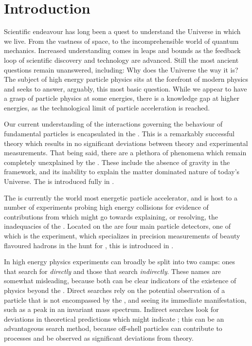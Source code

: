 \chapter{Introduction}
\label{ch:intro}


Scientific endeavour has long been a quest to understand the Universe in which we live.
From the vastness of space, to the incomprehensible world of quantum mechanics.
Increased understanding comes in leaps and bounds as the feedback loop of scientific discovery and
technology are advanced.
Still the most ancient questions remain unanswered, including: Why does the Universe the way it is?
The subject of high energy particle physics sits at the forefront of modern physics and seeks to
answer, arguably, this most basic question.
While we appear to have a grasp of particle physics at some energies, there is a knowledge gap at
higher energies, as the technological limit of particle acceleration is reached.

Our current understanding of the interactions governing the behaviour of fundamental particles is
encapsulated in the \sm.
This is a remarkably successful theory which results in no significant deviations between theory
and experimental measurements.
That being said, there are a plethora of phenomena which remain completely unexplained by the \sm.
These include the absence of gravity in the \sm framework, and its inability to explain the matter
dominated nature of today's Universe.
The \sm is introduced fully in .

The \lhc is currently the world most energetic particle accelerator, and is host to a number of
experiments probing high energy collisions for evidence of contributions from \np which might go
towards explaining, or resolving, the inadequacies of the \sm.
Located on the \lhc are four main particle detectors, one of which is the \lhcb experiment, which
specializes in precision measurements of beauty
flavoured hadrons in the hunt for \np, this is introduced in .

In high energy physics experiments can broadly be split into two camps: ones that search for \np
\emph{directly} and those that search \emph{indirectly}.
These names are somewhat misleading, because both can be clear indicators of the existence of
physics beyond the \sm.
Direct searches rely on the potential observation of a particle that is not encompassed by the \sm,
and seeing its immediate manifestation, such as a peak in an invariant mass spectrum.
Indirect searches look for deviations in theoretical predictions which might indicate \np; this can
be an advantageous search method, because off-shell particles can contribute to processes and be
observed as significant deviations from theory.

